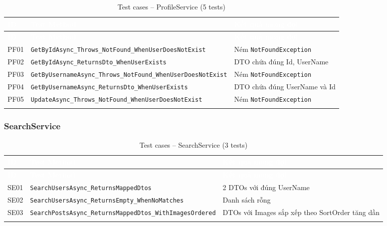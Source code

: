 \documentclass[a4paper]{article}
\begin{document}
\begin{longtable}{|C{0.8cm}|L{5.4cm}|L{7.4cm}|}
\hline
{}
\textcolor{white}{\textbf{ID}} &
\textcolor{white}{\textbf{Test Method}} &
\textcolor{white}{\textbf{Kết quả mong đợi}} \\
\hline
\endfirsthead
\hline
{}
\textcolor{white}{\textbf{ID}} &
\textcolor{white}{\textbf{Test Method}} &
\textcolor{white}{\textbf{Kết quả mong đợi}} \\
\hline
\endhead
\hline
\endfoot

PF01 & \texttt{GetByIdAsync\_Throws\_NotFound\_WhenUserDoesNotExist} & Ném \texttt{NotFoundException} \\
\hline
PF02 & \texttt{GetByIdAsync\_ReturnsDto\_WhenUserExists} & DTO chứa đúng Id, UserName \\
\hline
{}
PF03 & \texttt{GetByUsernameAsync\_Throws\_NotFound\_WhenUserDoesNotExist} & Ném \texttt{NotFoundException} \\
\hline
PF04 & \texttt{GetByUsernameAsync\_ReturnsDto\_WhenUserExists} & DTO chứa đúng UserName và Id \\
\hline
{}
PF05 & \texttt{UpdateAsync\_Throws\_NotFound\_WhenUserDoesNotExist} & Ném \texttt{NotFoundException} \\
\hline
\caption{Test cases -- ProfileService (5 tests)}
\end{longtable}

\subsubsection{SearchService}

\begin{longtable}{|C{0.8cm}|L{5.4cm}|L{7.4cm}|}
\hline
{}
\textcolor{white}{\textbf{ID}} &
\textcolor{white}{\textbf{Test Method}} &
\textcolor{white}{\textbf{Kết quả mong đợi}} \\
\hline
\endfirsthead
\hline
{}
\textcolor{white}{\textbf{ID}} &
\textcolor{white}{\textbf{Test Method}} &
\textcolor{white}{\textbf{Kết quả mong đợi}} \\
\hline
\endhead
\hline
\endfoot

SE01 & \texttt{SearchUsersAsync\_ReturnsMappedDtos} & 2 DTOs với đúng UserName \\
\hline
SE02 & \texttt{SearchUsersAsync\_ReturnsEmpty\_WhenNoMatches} & Danh sách rỗng \\
\hline
{}
SE03 & \texttt{SearchPostsAsync\_ReturnsMappedDtos\_WithImagesOrdered} & DTOs với Images sắp xếp theo SortOrder tăng dần \\
\hline
\caption{Test cases -- SearchService (3 tests)}
\end{longtable}
\end{document}
